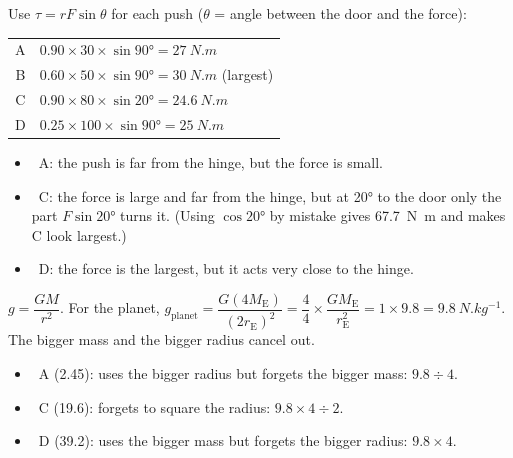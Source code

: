 \begin{practiceanswers}
\begin{practiceans}
  Use $\tau = rF\sin\theta$ for each push ($\theta$ = angle between the door and the force):
  \begin{center}
  \begin{tabular}{@{}cl@{}}
    A & $0.90 \times 30 \times \sin\ang{90} = \qty{27}{N.m}$\\
    B & $0.60 \times 50 \times \sin\ang{90} = \qty{30}{N.m}$ \quad (largest)\\
    C & $0.90 \times 80 \times \sin\ang{20} = \qty{24.6}{N.m}$\\
    D & $0.25 \times 100 \times \sin\ang{90} = \qty{25}{N.m}$
  \end{tabular}
  \end{center}
  \begin{itemize}
    \item \xmark\ A: the push is far from the hinge, but the force is small.
    \item \xmark\ C: the force is large and far from the hinge, but at \ang{20} to the door
          only the part $F\sin\ang{20}$ turns it. (Using $\cos\ang{20}$ by mistake gives
          \qty{67.7}{N.m} and makes C look largest.)
    \item \xmark\ D: the force is the largest, but it acts very close to the hinge.
  \end{itemize}
\end{practiceans}

\begin{practiceans}
  $g = \dfrac{GM}{r^2}$. For the planet,
  $g_\mathrm{planet} = \dfrac{G(4M_\mathrm{E})}{(2r_\mathrm{E})^2}
   = \dfrac{4}{4} \times \dfrac{GM_\mathrm{E}}{r_\mathrm{E}^2} = 1 \times 9.8
   = \qty{9.8}{N.kg^{-1}}$. The bigger mass and the bigger radius cancel out.
  \begin{itemize}
    \item \xmark\ A (2.45): uses the bigger radius but forgets the bigger mass:
          $9.8 \div 4$.
    \item \xmark\ C (19.6): forgets to square the radius: $9.8 \times 4 \div 2$.
    \item \xmark\ D (39.2): uses the bigger mass but forgets the bigger radius: $9.8 \times 4$.
  \end{itemize}
\end{practiceans}


\end{practiceanswers}
